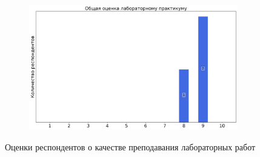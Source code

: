 \begin{figure}[H]
\begin{subfigure}[b]{0.45\textwidth}
            \end{subfigure}
            \begin{subfigure}[b]{0.45\textwidth}
                \centering
                \includegraphics[width=\textwidth]{images/1 course/Общая физика - механика/labniks-marks-Веревочкин Ю.Г.-3.png}
            \end{subfigure}	
            \caption{Оценки респондентов о качестве преподавания лабораторных работ}
        \end{figure}


